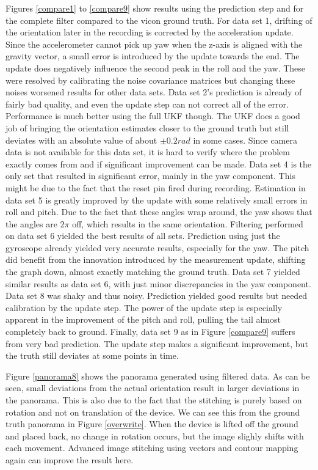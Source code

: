 \documentclass[letterpaper, 10 pt, conference]{ieeeconf}  %
\begin{document}
Figures \ref{compare1} to \ref{compare9} show results using the prediction step and for the complete filter compared to the vicon ground truth. For data set 1, drifting of the orientation later in the recording is corrected by the acceleration update. Since the accelerometer cannot pick up yaw when the z-axis is aligned with the gravity vector, a small error is introduced by the update towards the end. The update does negatively influence the second peak in the roll and the yaw. These were resolved by calibrating the noise covariance matrices but changing these noises worsened results for other data sets. Data set 2's prediction is already of fairly bad quality, and even the update step can not correct all of the error. Performance is much better using the full UKF though. The UKF does a good job of bringing the orientation estimates closer to the ground truth but still deviates with an absolute value of about $\pm 0.2 rad$ in some cases. Since camera data is not available for this data set, it is hard to verify where the problem exactly comes from and if significant improvement can be made. Data set 4 is the only set that resulted in significant error, mainly in the yaw component. This might be due to the fact that the reset pin fired during recording. Estimation in data set 5 is greatly improved by the update with some relatively small errors in roll and pitch. Due to the fact that these angles wrap around, the yaw shows that the angles are $2\pi$ off, which results in the same orientation. Filtering performed on data set 6 yielded the best results of all sets. Prediction using just the gyroscope already yielded very accurate results, especially for the yaw. The pitch did benefit from the innovation introduced by the measurement update, shifting the graph down, almost exactly matching the ground truth. Data set 7 yielded similar results as data set 6, with just minor discrepancies in the yaw component. Data set 8 was shaky and thus noisy. Prediction yielded good results but needed calibration by the update step. The power of the update step is especially apparent in the improvement of the pitch and roll, pulling the tail almost completely back to ground. Finally, data set 9 as in Figure \ref{compare9} suffers from very bad prediction. The update step makes a significant improvement, but the truth still deviates at some points in time. 

Figure \ref{panorama8} shows the panorama generated using filtered data. As can be seen, small deviations from the actual orientation result in larger deviations in the panorama. This is also due to the fact that the stitching is purely based on rotation and not on translation of the device. We can see this from the ground truth panorama in Figure \ref{overwrite}. When the device is lifted off the ground and placed back, no change in rotation occurs, but the image slighly shifts with each movement. Advanced image stitching using vectors and contour mapping again can improve the result here.
\end{document}
